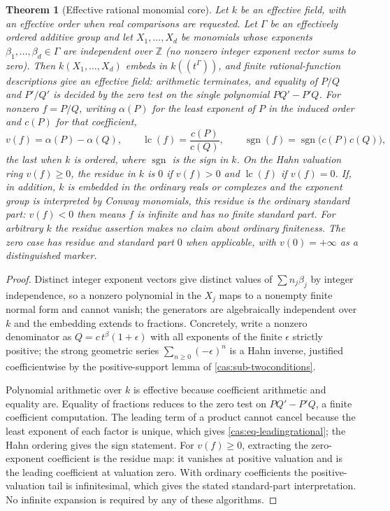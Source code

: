 \documentclass[11pt,letterpaper]{article}
\numberwithin{equation}{section}
\newtheorem{theorem}{Theorem}[section]
\theoremstyle{definition}
\theoremstyle{remark}
\newcommand{\Z}{\mathbb Z}
\newcommand{\lc}{\operatorname{lc}}
\newcommand{\sgn}{\operatorname{sgn}}
\begin{document}
\begin{theorem}[Effective rational monomial core]\label{cas:thm-core}
Let $k$ be an effective field, with an effective order when real comparisons are
requested. Let $\Gamma$ be an effectively ordered additive group and let
$X_1,\dots,X_d$ be monomials whose exponents $\beta_1,\dots,\beta_d\in\Gamma$ are
independent over $\Z$ (no nonzero integer exponent vector sums to zero).
Then $k(X_1,\dots,X_d)$ embeds in $k((t^{\Gamma}))$,
and finite rational-function descriptions give an \emph{effective field}:
arithmetic terminates, and equality of $P/Q$ and $P'/Q'$ is decided by the zero
test on the single polynomial $PQ'-P'Q$. For nonzero $f=P/Q$, writing $\alpha(P)$
for the least exponent of $P$ in the induced order and $c(P)$ for that
coefficient,
\begin{equation}\label{cas:eq-leadingrational}
 v(f)=\alpha(P)-\alpha(Q),\qquad
 \lc(f)=\frac{c(P)}{c(Q)},\qquad
 \sgn(f)=\sgn\bigl(c(P)c(Q)\bigr),
\end{equation}
the last when $k$ is ordered, where $\sgn$ is the sign in $k$. On the Hahn
valuation ring $v(f)\ge0$, the residue in $k$ is $0$ if $v(f)>0$ and
$\lc(f)$ if $v(f)=0$. If, in addition, $k$ is embedded in the ordinary reals
or complexes and the exponent group is interpreted by Conway monomials, this
residue is the ordinary standard part: $v(f)<0$ then means $f$ is infinite
and has no finite standard part. For arbitrary $k$ the residue assertion makes
no claim about ordinary finiteness. The zero case has residue and standard
part $0$ when applicable, with $v(0)=+\infty$ as a distinguished marker.
\end{theorem}
\begin{proof}
Distinct integer exponent vectors give distinct values of $\sum n_j\beta_j$ by
integer independence, so a nonzero polynomial in the $X_j$ maps to a
nonempty finite normal form and cannot vanish; the generators are algebraically
independent over $k$ and the embedding extends to fractions. Concretely, write a
nonzero denominator as $Q=c\,t^\beta(1+\epsilon)$ with all exponents of the
finite $\epsilon$ strictly positive; the strong geometric series
$\sum_{n\ge0}(-\epsilon)^n$ is a Hahn inverse, justified coefficientwise by the
positive-support lemma of \cref{cas:sub-twoconditions}.

Polynomial arithmetic over $k$ is effective because coefficient arithmetic and
equality are. Equality of fractions reduces to the zero test on $PQ'-P'Q$, a
finite coefficient computation. The leading term of a product cannot cancel
because the least exponent of each factor is unique, which gives
\eqref{cas:eq-leadingrational}; the Hahn ordering gives the sign statement.
For $v(f)\ge0$, extracting the zero-exponent coefficient is the residue map:
it vanishes at positive valuation and is the leading coefficient at valuation
zero. With ordinary coefficients the positive-valuation tail is infinitesimal,
which gives the stated standard-part interpretation. No infinite expansion is
required by any of these algorithms.
\end{proof}
\end{document}
